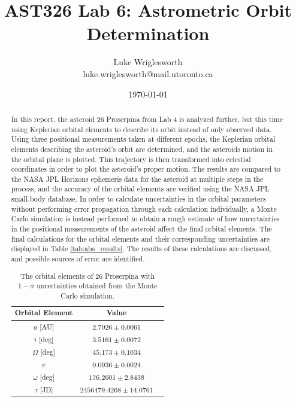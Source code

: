 \documentclass{article}
\title{AST326 Lab 6: Astrometric Orbit Determination}
\author{Luke Wriglesworth \\ \small luke.wriglesworth@mail.utoronto.ca}
\date{\today}
\begin{document}
\maketitle

\begin{abstract}
In this report, the asteroid 26 Proserpina from Lab 4 is analyzed further, but this time using Keplerian orbital elements to describe its orbit instead of only observed data. Using three positional measurements taken 
at different epochs, the Keplerian orbital elements describing the asteroid's orbit are determined, and the asteroids motion in the orbital plane is plotted. This trajectory is then transformed into celestial coordinates in 
order to plot the asteroid's proper motion. The results are compared to the NASA JPL Horizons ephemeris data for the asteroid at multiple steps in the process, and the accuracy of the orbital elements are verified using the NASA JPL small-body database. In order to calculate
uncertainties in the orbital parameters without performing error propagation through each calculation individually, a Monte Carlo simulation is instead performed to obtain a rough estimate of how uncertainties in the positional measurements
of the asteroid affect the final orbital elements. The final calculations for the orbital elements and their corresponding uncertainties are displayed in Table \ref{tab:abs_results}. The results of these calculations are discussed, 
and possible sources of error are identified. 

\begin{table}[H]
    \centering
    \begin{tabular}{|c|c|c|}
        \hline 
        \textbf{Orbital Element} & \textbf{Value}\\
        \hline
        $a$ [AU] & $2.7026 \pm 0.0061$ \\
        \hline
        $i$ [deg] & $3.5161 \pm 0.0072$ \\
        \hline
        $\Omega$ [deg] & $45.173 \pm 0.1034$ \\
        \hline
        $e$ & $0.0936 \pm 0.0024$  \\
        \hline
        $\omega$ [deg] & $176.2601 \pm 2.8438$ \\
        \hline
        $\tau$ [JD] & $2456479.4268 \pm 14.0761$ \\
        \hline
    \end{tabular}
        \caption{The orbital elements of 26 Proserpina with $1-\sigma$ uncertainties obtained from the Monte Carlo simulation.}
        \label{tab:abs_results}
    \end{table}


\end{abstract}
\end{document}
